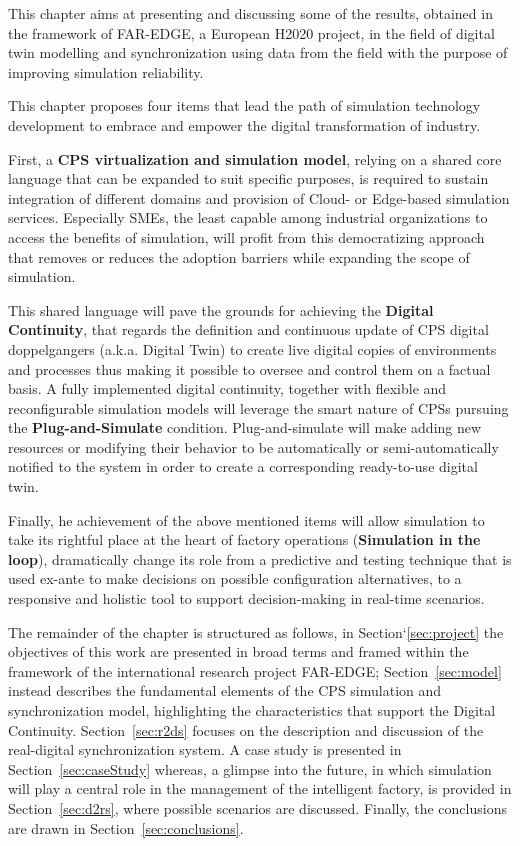 This chapter aims at presenting and discussing some of the results, obtained in the framework of FAR-EDGE, a European H2020 project, in the field of digital twin modelling and synchronization using data from the field with the purpose of improving simulation reliability. 

This chapter proposes four items that lead the path of simulation technology development to embrace and empower the digital transformation of industry. 

First, a \textbf{CPS virtualization and simulation model}, relying on a shared core language that can be expanded to suit specific purposes, is required to sustain integration of different domains and provision of Cloud- or Edge-based simulation services. 
Especially SMEs, the least capable among industrial organizations to access the benefits of simulation, will profit from this democratizing approach that removes or reduces the adoption barriers while expanding the scope of simulation.

This shared language will pave the grounds for achieving the \textbf{Digital Continuity}, that regards the definition and continuous update of CPS digital doppelgangers (a.k.a. Digital Twin) to create live digital copies of  environments and processes thus making it possible to oversee and control them on a factual basis.  A fully implemented digital continuity, together with flexible and reconfigurable simulation models will leverage the smart nature of CPSs pursuing the \textbf{Plug-and-Simulate} condition. Plug-and-simulate will make adding new resources or modifying their behavior to be automatically or semi-automatically notified to the system in order to create a corresponding ready-to-use digital twin.

Finally, he achievement of the above mentioned items will allow simulation to take its rightful place at the heart of factory operations (\textbf{Simulation in the loop}),  dramatically change its role from a predictive and testing technique that is used ex-ante to make decisions on possible configuration alternatives, to a responsive and holistic tool to support decision-making in real-time scenarios.



The remainder of the chapter is structured as follows, in Section`\ref{sec:project} the objectives of this work are presented in broad terms and framed within the framework of the international research project FAR-EDGE; Section~\ref{sec:model} instead describes the fundamental elements of the CPS simulation and synchronization model, highlighting the characteristics that support the Digital Continuity. Section~\ref{sec:r2ds} focuses on the description and discussion of the real-digital synchronization system. A case study is presented in Section~\ref{sec:caseStudy} whereas, a glimpse into the future, in which simulation will play a central role in the management of the intelligent factory, is provided in Section~\ref{sec:d2rs}, where possible scenarios are discussed. Finally, the conclusions are drawn in Section~\ref{sec:conclusions}.  






